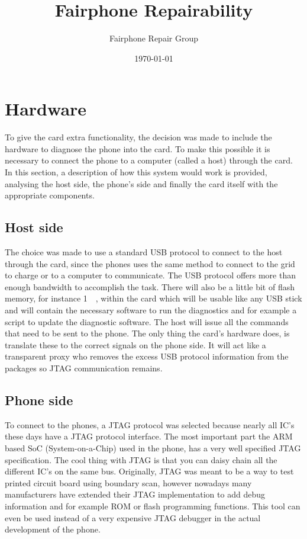\documentclass[final,a4paper]{report} %
\author{Fairphone Repair Group}
\title{Fairphone Repairability}
\date{\today}
\begin{document}
\section{Hardware}
\label{sec:scrw-it-hardware}
To give the card extra functionality, the decision was made to include the hardware to diagnose the phone into the card.
To make this possible it is necessary to connect the phone to a computer (called a host) through the card. In this section, a description of how this system would work is provided, analysing the host side, the phone's side and finally the card itself with the appropriate components.

\subsection{Host side}
The choice was made to use a standard USB protocol to connect to the host through the card, since the phones uses the same method to connect to the grid to charge or to a computer to communicate.
The USB protocol offers more than enough bandwidth to accomplish the task.
There will also be a little bit of flash memory, for instance \SI{1}{\gibi\bit}, within the card which will be usable like any USB stick and will contain the necessary software to run the diagnostics and for example a script to update the diagnostic software.
The host will issue all the commands that need to be sent to the phone. The only thing the card's hardware does, is translate these to the correct signals on the phone side.
It will act like a transparent proxy who removes the excess USB protocol information from the packages so JTAG communication remains.

\subsection{Phone side}
To connect to the phones, a JTAG protocol was selected because nearly all IC's these days have a JTAG protocol interface.
The most important part the ARM based SoC (System-on-a-Chip) used in the phone, has a very well specified JTAG specification.
The cool thing with JTAG is that you can daisy chain all the different IC's on the same bus.
Originally, JTAG was meant to be a way to test printed circuit board using boundary scan, however nowadays many manufacturers have extended their JTAG implementation to add debug information and for example ROM or flash programming functions.
This tool can even be used instead of a very expensive JTAG debugger in the actual development of the phone.
\end{document}

